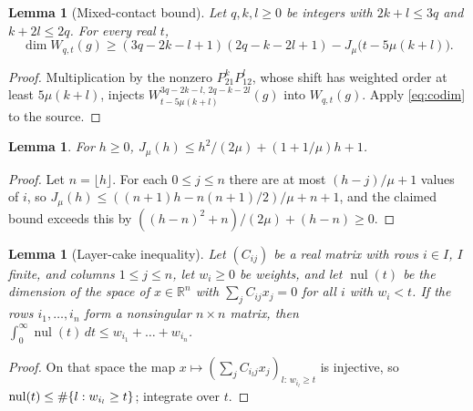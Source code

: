 \documentclass[11pt,reqno]{amsart}
\newtheorem{lemma}[theorem]{Lemma}
\theoremstyle{definition}
\theoremstyle{remark}
\numberwithin{equation}{section}
\newcommand{\R}{\mathbb R}\newcommand{\Z}{\mathbb Z}\newcommand{\N}{\mathbb N}
\begin{document}
\begin{lemma}[Mixed-contact bound]\label{lem:mixed}
Let $q,k,l\ge0$ be integers with $2k+l\le3q$ and $k+2l\le2q$. For every real
$t$,
\[
 \dim W_{q,t}(g)\ge(3q-2k-l+1)(2q-k-2l+1)-J_\mu\bigl(t-5\mu(k+l)\bigr).
\]
\end{lemma}
\begin{proof}
Multiplication by the nonzero $P_{21}^kP_{12}^l$, whose shift has
weighted order at least $5\mu(k+l)$, injects
$W^{3q-2k-l,\,2q-k-2l}_{t-5\mu(k+l)}(g)$ into $W_{q,t}(g)$.
Apply \eqref{eq:codim} to the source.
\end{proof}

\begin{lemma}\label{lem:triangle}
For $h\ge0$, $J_\mu(h)\le h^2/(2\mu)+(1+1/\mu)h+1$.
\end{lemma}
\begin{proof}
Let $n=\lfloor h\rfloor$. For each $0\le j\le n$ there are at most
$(h-j)/\mu+1$ values of $i$, so
$J_\mu(h)\le((n+1)h-n(n+1)/2)/\mu+n+1$, and the claimed bound exceeds this
by $((h-n)^2+n)/(2\mu)+(h-n)\ge0$.
\end{proof}

\begin{lemma}[Layer-cake inequality]\label{lem:layer}
Let $(C_{ij})$ be a real matrix with rows $i\in I$, $I$ finite, and columns
$1\le j\le n$, let $w_i\ge0$ be weights, and let $\operatorname{nul}(t)$ be the dimension
of the space of $x\in\R^n$ with $\sum_jC_{ij}x_j=0$ for all $i$ with
$w_i<t$. If the rows $i_1,\dots,i_n$ form a nonsingular $n\times n$ matrix,
then $\int_0^\infty\operatorname{nul}(t)\,dt\le w_{i_1}+\dots+w_{i_n}$.
\end{lemma}
\begin{proof}
On that space the map $x\mapsto(\sum_jC_{i_lj}x_j)_{l:\,w_{i_l}\ge t}$ is
injective, so $\operatorname{nul}(t)\le\#\{l:w_{i_l}\ge t\}$; integrate over $t$.
\end{proof}
\end{document}
